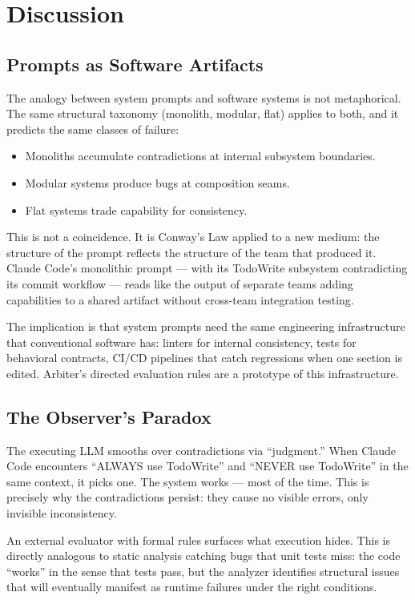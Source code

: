 \section{Discussion}

\subsection{Prompts as Software Artifacts}

The analogy between system prompts and software systems is not
metaphorical. The same structural taxonomy (monolith, modular, flat)
applies to both, and it predicts the same classes of failure:

\begin{itemize}
\tightlist
\item
  Monoliths accumulate contradictions at internal subsystem boundaries.
\item
  Modular systems produce bugs at composition seams.
\item
  Flat systems trade capability for consistency.
\end{itemize}

This is not a coincidence. It is Conway's Law applied to a new medium:
the structure of the prompt reflects the structure of the team that
produced it. Claude Code's monolithic prompt --- with its TodoWrite
subsystem contradicting its commit workflow --- reads like the output of
separate teams adding capabilities to a shared artifact without
cross-team integration testing.

The implication is that system prompts need the same engineering
infrastructure that conventional software has: linters for internal
consistency, tests for behavioral contracts, CI/CD pipelines that catch
regressions when one section is edited. Arbiter's directed evaluation
rules are a prototype of this infrastructure.

\subsection{The Observer's Paradox}

The executing LLM smooths over contradictions via ``judgment.'' When
Claude Code encounters ``ALWAYS use TodoWrite'' and ``NEVER use
TodoWrite'' in the same context, it picks one. The system works --- most
of the time. This is precisely why the contradictions persist: they
cause no visible errors, only invisible inconsistency.

An external evaluator with formal rules surfaces what execution hides.
This is directly analogous to static analysis catching bugs that unit
tests miss: the code ``works'' in the sense that tests pass, but the
analyzer identifies structural issues that will eventually manifest as
runtime failures under the right conditions.

